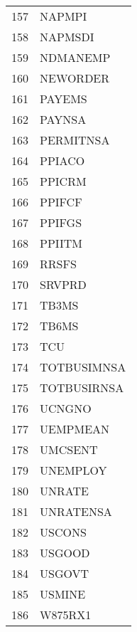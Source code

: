 \begin{table}[ht]
\begin{tabular}{rl}
  157 & NAPMPI \\ 
  158 & NAPMSDI \\ 
  159 & NDMANEMP \\ 
  160 & NEWORDER \\ 
  161 & PAYEMS \\ 
  162 & PAYNSA \\ 
  163 & PERMITNSA \\ 
  164 & PPIACO \\ 
  165 & PPICRM \\ 
  166 & PPIFCF \\ 
  167 & PPIFGS \\ 
  168 & PPIITM \\ 
  169 & RRSFS \\ 
  170 & SRVPRD \\ 
  171 & TB3MS \\ 
  172 & TB6MS \\ 
  173 & TCU \\ 
  174 & TOTBUSIMNSA \\ 
  175 & TOTBUSIRNSA \\ 
  176 & UCNGNO \\ 
  177 & UEMPMEAN \\ 
  178 & UMCSENT \\ 
  179 & UNEMPLOY \\ 
  180 & UNRATE \\ 
  181 & UNRATENSA \\ 
  182 & USCONS \\ 
  183 & USGOOD \\ 
  184 & USGOVT \\ 
  185 & USMINE \\ 
  186 & W875RX1 \\ 
   \hline
\end{tabular}
\end{table}
